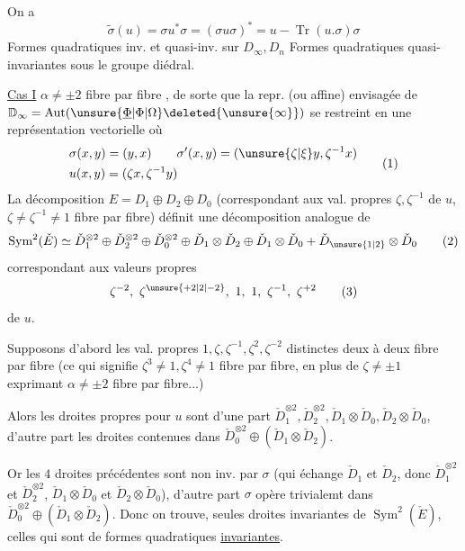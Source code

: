 On a
\[
\boxed{\widetilde\sigma(u)=\sigma u^*\sigma=(\sigma u\sigma)^*=u-\operatorname{Tr}(u.\sigma)\sigma}
\]
Formes quadratiques inv. et quasi-inv. sur $D_\infty,D_n$
Formes quadratiques quasi-invariantes sous le groupe diédral.

\uline{Cas I} $\alpha\ne\pm2$ fibre par fibre , de sorte que la repr.  (ou affine) envisagée de $\mathbb D_\infty=\operatorname{Aut}(\unsure{\underline\Phi|\Phi|\Omega}\deleted{\unsure{\infty}})$ se restreint en une représentation vectorielle où
\[
\begin{aligned}
&\sigma(x,y)=(y,x)\qquad \sigma'(x,y)=(\unsure{\zeta|\xi}y,\zeta^{-1}x)\\
&u(x,y)=(\zeta x,\zeta^{-1}y)
\end{aligned}\tag*{(1)}
\]
La décomposition $E=D_1\oplus D_2\oplus D_0$ (correspondant aux val. propres $\zeta,\zeta^{-1}$ de $u$\unsure{$\}$|,}, $\zeta\ne\zeta^{-1}\ne1$ fibre par fibre) définit une décomposition analogue de
\[
\operatorname{Sym}^{2}(\check E)\simeq
\check D_1^{\otimes2}\oplus\check D_2^{\otimes2}\oplus\check D_0^{\otimes2}
\oplus\check D_1\otimes\check D_2\oplus\check D_1\otimes\check D_0+
\check D_{\unsure{1|2}}\otimes\check D_0
\tag*{(2)}
\]
correspondant aux valeurs propres
\[
\zeta^{-2},\ \zeta^{\unsure{+2|2|-2}},\ 1,\ 1,\ \zeta^{-1},\ \zeta^{+2}
\tag*{(3)}
\]
de $u$.

Supposons d'abord les  val. propres $1,\zeta,\zeta^{-1},\zeta^{2},\zeta^{-2}$ distinctes deux à deux fibre par fibre (ce qui signifie $\zeta^3\ne1,\zeta^4\ne1$ fibre par fibre, en plus de $\zeta\ne\pm1$  exprimant $\alpha\ne\pm2$ fibre par fibre...)

Alors les droites propres pour $u$ sont  d'une part $\check D_1^{\otimes2},\check D_2^{\otimes2},\check D_1\otimes\check D_0,\check D_2\otimes\check D_0$, d'autre part les droites contenues  dans $\check D_0^{\otimes2}\oplus(\check D_1\otimes\check D_2)$.

Or les $4$ droites précédentes sont non inv. par $\sigma$ (qui échange $\check D_1$ et $\check D_2$, donc $\check D_1^{\otimes2}$ et $\check D_2^{\otimes2}$, $\check D_1\otimes\check D_0$ et $\check D_2\otimes\check D_0$), d'autre part $\sigma$ opère trivialemt dans $\check D_0^{\otimes2}\oplus(\check D_1\otimes\check D_2)$. Donc on trouve, 
seules droites invariantes  de $\operatorname{Sym}^2(\check E)$,  celles qui sont  de formes quadratiques \uline{invariantes}.

